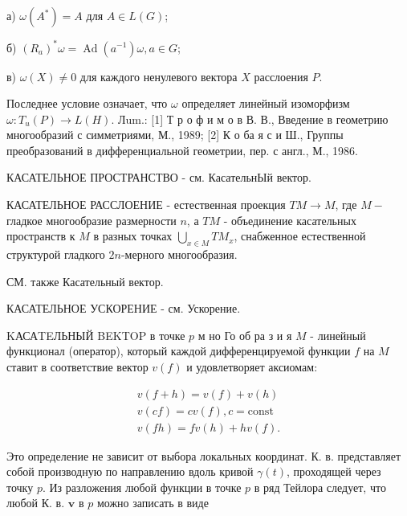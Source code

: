 \documentclass[10pt]{article}
\begin{document}
а) $\omega\left(A^{*}\right)=A$ для $A \in L(G)$;



б) $\left(R_{a}\right)^{*} \omega=\operatorname{Ad}\left(a^{-1}\right) \omega, a \in G$;



в) $\omega(X) \neq 0$ для каждого ненулевого вектора $X$ расслоения $P$.



Последнее условие означает, что $\omega$ определяет линейный изоморфизм $\omega: T_{u}(P) \rightarrow L(H)$. Лum.: [1] Т р о ф и м о в В. В., Введение в геометрию многообразий с симметриями, М., 1989; [2] К о ба я с и Ш., Группы преобразований в дифференциальной геометрии, пер. с англ., М., 1986.



КАСАТЕЛЬНОЕ ПРОСТРАНСТВО - см. КасательнЫй вектор.



КАСАТЕЛЬНОЕ РАССЛОЕНИЕ - естественная проекция $T M \rightarrow M$, где $M-$ гладкое многообразие размерности $n$, а $T M$ - объединение касательных пространств к $M$ в разных точках $\bigcup_{x \in M} T M_{x}$, снабженное естественной структурой гладкого $2 n$-мерного многообразия.



СМ. также Касательный вектор.



КАСАТЕЛЬНОЕ УСКОРЕНИЕ - см. Ускорение.



KАСАTEЛЬНЫЙ BEKTOP в точке $p$ м но Го об ра з и я $M$ - линейный функционал (оператор), который каждой дифференцируемой функции $f$ на $M$ ставит в соответствие вектор $v(f)$ и удовлетворяет аксиомам:



\[

\begin{gathered}

v(f+h)=v(f)+v(h) \\

v(c f)=c v(f), c=\mathrm{const} \\

v(f h)=f v(h)+h v(f) .

\end{gathered}

\]



Это определение не зависит от выбора локальных координат. К. в. представляет собой производную по направлению вдоль кривой $\gamma(t)$, проходящей через точку $p$. Из разложения любой функции в точке $p$ в ряд Тейлора следует, что любой К. в. $\boldsymbol{v}$ в $p$ можно записать в виде
\end{document}
